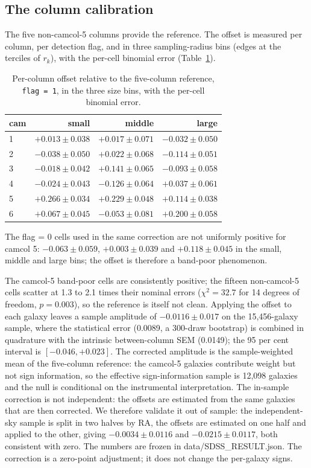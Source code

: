 \documentclass[linenumbers]{aa}
\begin{document}
\subsection{The column calibration}
The five non-camcol-5 columns provide the reference. The offset is measured per column, per detection flag, and in three sampling-radius bins (edges at
the terciles of $r_k$), with the per-cell binomial error (Table~\ref{tab:calib}).

\begin{table}[htbp]
\centering
\caption{Per-column offset relative to the five-column reference, \texttt{flag = 1}, in the three size bins,
with the per-cell binomial error.}
\label{tab:calib}
\begin{tabular}{lrrr}
\toprule
cam & small & middle & large \\
\midrule
1 & $+0.013 \pm 0.038$ & $+0.017 \pm 0.071$ & $-0.032 \pm 0.050$ \\
2 & $-0.038 \pm 0.050$ & $+0.022 \pm 0.068$ & $-0.114 \pm 0.051$ \\
3 & $-0.018 \pm 0.042$ & $+0.141 \pm 0.065$ & $-0.093 \pm 0.058$ \\
4 & $-0.024 \pm 0.043$ & $-0.126 \pm 0.064$ & $+0.037 \pm 0.061$ \\
5 & $+0.266 \pm 0.034$ & $+0.229 \pm 0.048$ & $+0.114 \pm 0.038$ \\
6 & $+0.067 \pm 0.045$ & $-0.053 \pm 0.081$ & $+0.200 \pm 0.058$ \\
\bottomrule
\end{tabular}
\end{table}

\noindent The flag = 0 cells used in the same correction are not uniformly positive for camcol 5:
$-0.063 \pm 0.059$, $+0.003 \pm 0.039$ and $+0.118 \pm 0.045$ in the small, middle and large bins;
the offset is therefore a band-poor phenomenon.

The camcol-5 band-poor cells are consistently positive; the fifteen non-camcol-5 cells scatter at
1.3 to 2.1 times their nominal errors ($\chi^2 = 32.7$ for 14 degrees of freedom, $p = 0.003$), so
the reference is itself not clean. Applying the offset to each galaxy leaves a sample amplitude of
$\mathbf{-0.0116 \pm 0.017}$ on the 15,456-galaxy sample, where the statistical error (0.0089, a
300-draw bootstrap) is combined in quadrature with the intrinsic between-column SEM (0.0149); the 95 per cent interval is $[-0.046, +0.023]$. The corrected amplitude is the
sample-weighted mean of the five-column reference: the camcol-5 galaxies contribute weight but not
sign information, so the effective sign-information sample is 12,098 galaxies and the null is
conditional on the instrumental interpretation. The in-sample correction is not independent: the offsets are
estimated from the same galaxies that are then corrected. We therefore validate it out of sample:
the independent-sky sample is split in two halves by RA, the offsets are estimated on one half and
applied to the other, giving $-0.0034 \pm 0.0116$ and $-0.0215 \pm 0.0117$, both consistent with
zero. The numbers are frozen in data/SDSS\_RESULT.json. The correction is a zero-point adjustment;
it does not change the per-galaxy signs.
\end{document}
